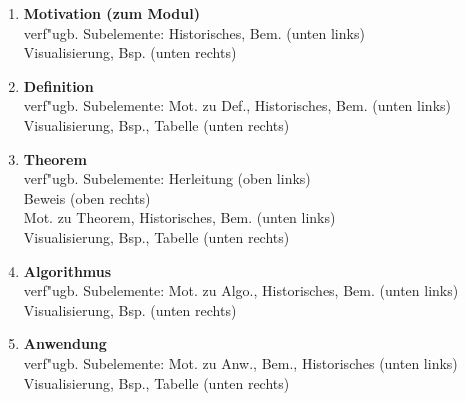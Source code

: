    \begin{enumerate}
    \item \textbf{Motivation (zum Modul)}\\
        verf"ugb. Subelemente: Historisches, Bem. \hfill{(unten links)}\\ 
	\phantom{verf"ugb. Subelemente: }Visualisierung, Bsp. \hfill{(unten rechts)}\\[-5mm]
	\begin{center}
	\end{center}
    \item \textbf{Definition}\\
        verf"ugb. Subelemente: Mot. zu Def., Historisches, Bem. \hfill{(unten links)}\\
	\phantom{verf"ugb. Subelemente: }Visualisierung, Bsp., Tabelle \hfill{(unten rechts)}\\[-5mm]
	\begin{center}
	\end{center}
    \item \textbf{Theorem}\\
        verf"ugb. Subelemente: Herleitung \hfill{(oben links)}\\
	\phantom{verf"ugb. Subelemente: }Beweis \hfill{(oben rechts)}\\
	\phantom{verf"ugb. Subelemente: }Mot. zu Theorem, Historisches, Bem. \hfill{(unten links)}\\
        \phantom{verf"ugb. Subelemente: }Visualisierung, Bsp., Tabelle \hfill{(unten rechts)}\\[-5mm]
	\begin{center}
	\end{center} 
    \item \textbf{Algorithmus}\\
        verf"ugb. Subelemente: Mot. zu Algo., Historisches, Bem. \hfill{(unten links)}\\
        \phantom{verf"ugb. Subelemente: }Visualisierung, Bsp. \hfill{(unten rechts)}\\[-5mm]
	\begin{center}
	\end{center} 
    \item \textbf{Anwendung}\\
        verf"ugb. Subelemente: Mot. zu Anw., Bem., Historisches \hfill{(unten links)}\\
        \phantom{verf"ugb. Subelemente: }Visualisierung, Bsp., Tabelle \hfill{(unten rechts)}\\[-5mm]
	\begin{center}
	\end{center} 
    \end{enumerate}

